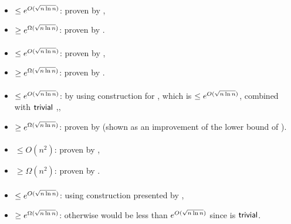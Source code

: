\paragraph{\ONFA{}\tto\ODFA}
\begin{itemize}
	\item $\le e^{O(\sqrt{n\ln n})}$: proven by ,
	\item $\ge e^{\Omega(\sqrt{n\ln n})}$: proven by .
\end{itemize}
\paragraph{\TDFA{}\tto\ODFA}\label{cost:2DFAto1DFAu}
\begin{itemize}
	\item $\le e^{O(\sqrt{n\ln n})}$: proven by ,
	\item $\ge e^{\Omega(\sqrt{n\ln n})}$: proven by .
\end{itemize}
\paragraph{\TDFA{}\tto\ONFA}\label{cost:2DFAto1NFAu}
\begin{itemize}
	\item $\le e^{O(\sqrt{n\ln n})}$: by using construction for \hyperref[cost:2DFAto1DFAu]{\TDFA{}\tto\ODFA}, which is $\le e^{O(\sqrt{n\ln n})}$, combined with $\mathsf{trivial}$ \ODFA{}\tto\ONFA,,
	\item $\ge e^{\Omega(\sqrt{n\ln n})}$: proven by  (shown as an improvement of the lower bound of \hyperref[cost:2DFAto1DFAu]{\TDFA{}\tto\ODFA}).
\end{itemize}
\paragraph{\ONFA{}\tto\TDFA}\label{cost:1NFAto2DFAu}
\begin{itemize}
	\item $\le O(n^2)$: proven by ,
	\item $\ge \Omega(n^2)$: proven by .
\end{itemize}
\paragraph{\TNFA{}\tto\ODFA}\label{cost:2NFAto1DFAu}
\begin{itemize}
	\item $\le e^{O(\sqrt{n\ln n})}$: using construction presented by ,
	\item $\ge e^{\Omega(\sqrt{n\ln n})}$: otherwise \hyperref[cost:2DFAto1DFAu]{\TDFA{}\tto\ODFA} would be less than $e^{O(\sqrt{n\ln n})}$ since \TDFA{}\tto\TNFA is $\mathsf{trivial}$.
\end{itemize}
